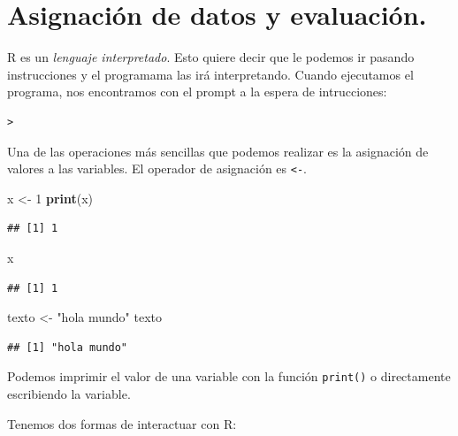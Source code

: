 \documentclass[spanish,]{book}
\newenvironment{Shaded}{\begin{snugshade}}{\end{snugshade}}
\newcommand{\KeywordTok}[1]{\textcolor[rgb]{0.13,0.29,0.53}{\textbf{#1}}}
\newcommand{\DecValTok}[1]{\textcolor[rgb]{0.00,0.00,0.81}{#1}}
\newcommand{\StringTok}[1]{\textcolor[rgb]{0.31,0.60,0.02}{#1}}
\newcommand{\NormalTok}[1]{#1}
\begin{document}
\section{Asignación de datos y
evaluación.}\label{asignacion-de-datos-y-evaluacion.}

R es un \emph{lenguaje interpretado}. Esto quiere decir que le podemos
ir pasando instrucciones y el programama las irá interpretando. Cuando
ejecutamos el programa, nos encontramos con el prompt a la espera de
intrucciones:

\begin{verbatim}
>
\end{verbatim}

Una de las operaciones más sencillas que podemos realizar es la
asignación de valores a las variables. El operador de asignación es
\texttt{\textless{}-}.

\begin{Shaded}
\begin{Highlighting}[]
\NormalTok{x <-}\StringTok{ }\DecValTok{1}
\KeywordTok{print}\NormalTok{(x)}
\end{Highlighting}
\end{Shaded}

\begin{verbatim}
## [1] 1
\end{verbatim}

\begin{Shaded}
\begin{Highlighting}[]
\NormalTok{x}
\end{Highlighting}
\end{Shaded}

\begin{verbatim}
## [1] 1
\end{verbatim}

\begin{Shaded}
\begin{Highlighting}[]
\NormalTok{texto <-}\StringTok{ "hola mundo"}
\NormalTok{texto}
\end{Highlighting}
\end{Shaded}

\begin{verbatim}
## [1] "hola mundo"
\end{verbatim}

Podemos imprimir el valor de una variable con la función
\texttt{print()} o directamente escribiendo la variable.

Tenemos dos formas de interactuar con R:
\end{document}
